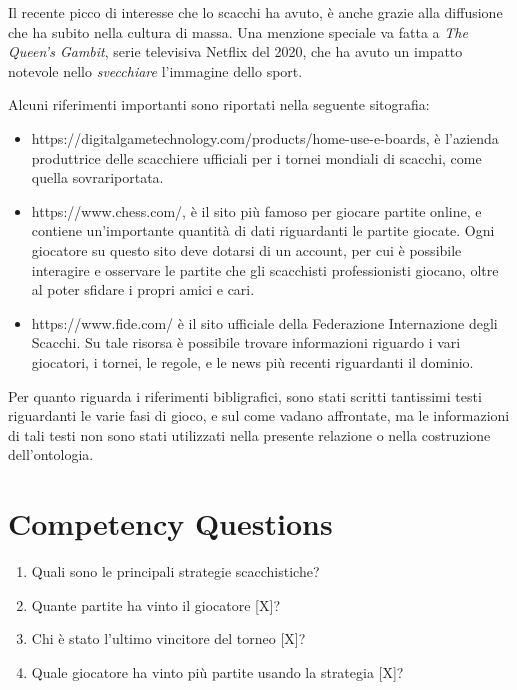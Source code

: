 \documentclass[12pt]{book}
\begin{document}
Il recente picco di interesse che lo scacchi ha avuto, è anche grazie alla 
diffusione che ha subito nella cultura di
massa. Una menzione speciale va fatta a \textit{The Queen's Gambit}, 
serie televisiva Netflix del 2020, che ha avuto un impatto notevole nello
\textit{svecchiare} l'immagine dello sport.


Alcuni riferimenti importanti sono riportati nella seguente
sitografia:
\begin{itemize}
  \item
    https://digitalgametechnology.com/products/home-use-e-boards, è
    l'azienda produttrice delle scacchiere ufficiali per i tornei
    mondiali di scacchi, come quella sovrariportata.
  \item https://www.chess.com/, è il sito più famoso per giocare
    partite online, e contiene un'importante quantità di dati
    riguardanti le partite giocate. Ogni giocatore su questo sito deve
    dotarsi di un account, per cui è possibile interagire e osservare
    le partite che gli scacchisti professionisti giocano, oltre al
    poter sfidare i propri amici e cari.
  \item https://www.fide.com/ è il sito ufficiale della Federazione
    Internazione degli Scacchi. Su tale risorsa è possibile trovare
    informazioni riguardo i vari giocatori, i tornei, le regole, e le
    news più recenti riguardanti il dominio.
\end{itemize}

Per quanto riguarda i riferimenti bibligrafici, sono stati scritti
tantissimi testi riguardanti le varie fasi di gioco, e sul come vadano
affrontate, ma le informazioni di tali testi non sono stati utilizzati
nella presente relazione o nella costruzione dell'ontologia.


\chapter{Competency Questions}

\begin{enumerate}
  \item Quali sono le principali strategie scacchistiche?
  \item Quante partite ha vinto il giocatore [X]?
  \item Chi è stato l'ultimo vincitore del torneo [X]?
  \item Quale giocatore ha vinto più partite usando la strategia [X]?
\end{enumerate}
\end{document}
